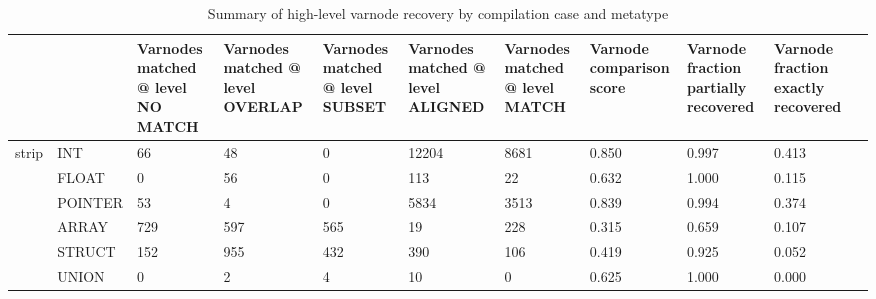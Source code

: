 \begin{table}
\centering
\caption{Summary of high-level varnode recovery by compilation case and metatype}
\label{table:opts-varnodes-summary-metatypes}
\begin{tabular}{lp{1.43cm}p{1.10cm}p{1.10cm}p{1.10cm}p{1.10cm}p{1.10cm}p{1.10cm}p{1.10cm}p{1.10cm}p{1.10cm}}
\toprule
      &       &  Varnodes matched @ level NO MATCH &  Varnodes matched @ level OVERLAP &  Varnodes matched @ level SUBSET &  Varnodes matched @ level ALIGNED &  Varnodes matched @ level MATCH &  Varnode comparison score &  Varnode fraction partially recovered &  Varnode fraction exactly recovered \\
\midrule
\multirow{6}{*}{strip} & INT &                                 66 &                                48 &                                0 &                             12204 &                            8681 &                     0.850 &                                 0.997 &                               0.413 \\
      & FLOAT &                                  0 &                                56 &                                0 &                               113 &                              22 &                     0.632 &                                 1.000 &                               0.115 \\
      & POINTER &                                 53 &                                 4 &                                0 &                              5834 &                            3513 &                     0.839 &                                 0.994 &                               0.374 \\
      & ARRAY &                                729 &                               597 &                              565 &                                19 &                             228 &                     0.315 &                                 0.659 &                               0.107 \\
      & STRUCT &                                152 &                               955 &                              432 &                               390 &                             106 &                     0.419 &                                 0.925 &                               0.052 \\
      & UNION &                                  0 &                                 2 &                                4 &                                10 &                               0 &                     0.625 &                                 1.000 &                               0.000 \\

\end{tabular}
\end{table}
